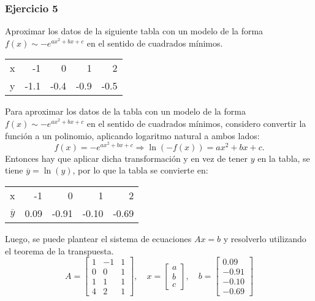 \documentclass{article}
\begin{document}
\subsubsection{Ejercicio 5}
Aproximar los datos de la siguiente tabla con un modelo de la forma $f(x) \sim -e^{ax^2+bx+c}$ en el sentido de cuadrados mínimos.
\begin{center}
\begin{tabular}{||r||r|r|r|r||}
\hline
x & -1 & 0 & 1 & 2\\
y & -1.1 & -0.4 & -0.9 & -0.5\\
\hline
\end{tabular}
\end{center}
Para aproximar los datos de la tabla con un modelo de la forma \( f(x) \sim -e^{ax^2+bx+c} \) en el sentido de cuadrados mínimos, considero convertir la función a un polinomio, aplicando logaritmo natural a ambos lados:
\[
f(x) = -e^{ax^2+bx+c} \Rightarrow \ln(-f(x)) = ax^2 + bx + c.
\]
Entonces hay que aplicar dicha transformación y en vez de tener \( y \) en la tabla, se tiene \( \overline{y} = \ln(y) \), por lo que la tabla se convierte en:
\begin{center}
\begin{tabular}{||r||r|r|r|r||}
\hline
x & -1 & 0 & 1 & 2\\
$\overline{y}$ & 0.09 & -0.91 & -0.10 & -0.69\\
\hline
\end{tabular}
\end{center}
Luego, se puede plantear el sistema de ecuaciones \( Ax = b \) y resolverlo utilizando el teorema de la transpuesta.
\begin{equation}
    A = \begin{bmatrix}
        1 & -1 & 1 \\
        0 & 0 & 1 \\
        1 & 1 & 1 \\
        4 & 2 & 1
    \end{bmatrix}, \quad x = \begin{bmatrix}
        a \\
        b \\
        c
    \end{bmatrix}, \quad b = \begin{bmatrix}
        0.09 \\
        -0.91 \\
        -0.10 \\
        -0.69
    \end{bmatrix}
\end{equation}
\end{document}
